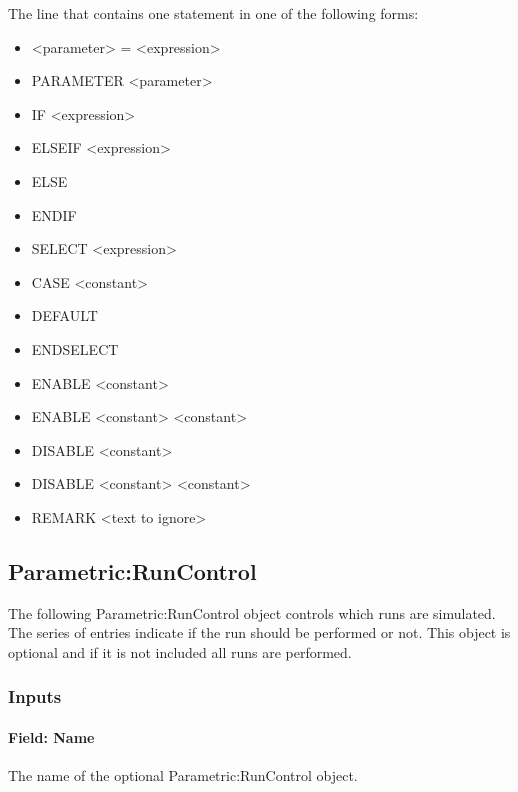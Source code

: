 The line that contains one statement in one of the following forms:

\begin{itemize}
\item
  \textless{}parameter\textgreater{} = \textless{}expression\textgreater{}
\item
  PARAMETER \textless{}parameter\textgreater{}
\item
  IF \textless{}expression\textgreater{}
\item
  ELSEIF \textless{}expression\textgreater{}
\item
  ELSE
\item
  ENDIF
\item
  SELECT \textless{}expression\textgreater{}
\item
  CASE \textless{}constant\textgreater{}
\item
  DEFAULT
\item
  ENDSELECT
\item
  ENABLE \textless{}constant\textgreater{}
\item
  ENABLE \textless{}constant\textgreater{} \textless{}constant\textgreater{}
\item
  DISABLE \textless{}constant\textgreater{}
\item
  DISABLE \textless{}constant\textgreater{} \textless{}constant\textgreater{}
\item
  REMARK \textless{}text to ignore\textgreater{}
\end{itemize}

\subsection{Parametric:RunControl}\label{parametricruncontrol}

The following Parametric:RunControl object controls which runs are simulated. The series of entries indicate if the run should be performed or not. This object is optional and if it is not included all runs are performed.

\subsubsection{Inputs}\label{inputs-2-025}

\paragraph{Field: Name}\label{field-name-1-026}

The name of the optional Parametric:RunControl object.

